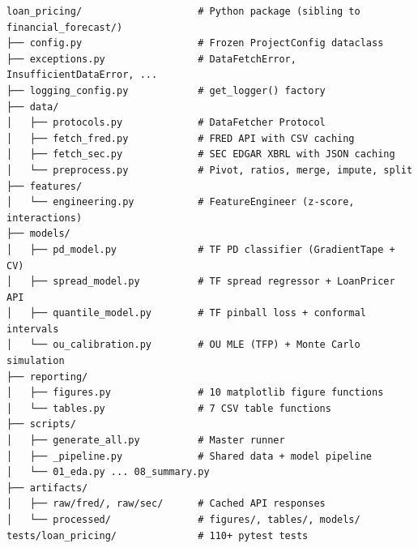 \documentclass[12pt, a4paper]{article}
\theoremstyle{definition}
\begin{document}
\begin{verbatim}
loan_pricing/                    # Python package (sibling to financial_forecast/)
├── config.py                    # Frozen ProjectConfig dataclass
├── exceptions.py                # DataFetchError, InsufficientDataError, ...
├── logging_config.py            # get_logger() factory
├── data/
│   ├── protocols.py             # DataFetcher Protocol
│   ├── fetch_fred.py            # FRED API with CSV caching
│   ├── fetch_sec.py             # SEC EDGAR XBRL with JSON caching
│   └── preprocess.py            # Pivot, ratios, merge, impute, split
├── features/
│   └── engineering.py           # FeatureEngineer (z-score, interactions)
├── models/
│   ├── pd_model.py              # TF PD classifier (GradientTape + CV)
│   ├── spread_model.py          # TF spread regressor + LoanPricer API
│   ├── quantile_model.py        # TF pinball loss + conformal intervals
│   └── ou_calibration.py        # OU MLE (TFP) + Monte Carlo simulation
├── reporting/
│   ├── figures.py               # 10 matplotlib figure functions
│   └── tables.py                # 7 CSV table functions
├── scripts/
│   ├── generate_all.py          # Master runner
│   ├── _pipeline.py             # Shared data + model pipeline
│   └── 01_eda.py ... 08_summary.py
├── artifacts/
│   ├── raw/fred/, raw/sec/      # Cached API responses
│   └── processed/               # figures/, tables/, models/
tests/loan_pricing/              # 110+ pytest tests
\end{verbatim}
\end{document}
